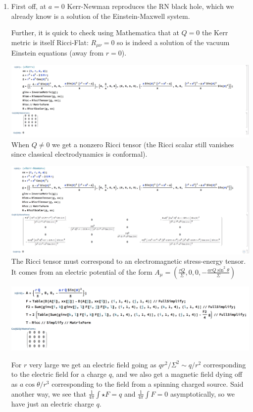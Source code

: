 \documentclass[11pt, class=article, crop=false]{standalone}
\begin{document}
\begin{enumerate}
	\item First off, at $a = 0$ Kerr-Newman reproduces the RN black hole, which we already know is a solution of the Einstein-Maxwell system. 
	
	Further, it is quick to check using Mathematica that at $Q=0$ the Kerr metric is itself Ricci-Flat: $R_{\mu \nu} = 0$ so is indeed a solution of the vacuum Einstein equations (away from $r = 0$). 
	
	\hspace{-.5in}
	\includegraphics[scale=0.5]{"Figures/Kerr"}
	When $Q \neq 0$ we get a nonzero Ricci tensor (the Ricci scalar still vanishes since classical electrodynamics is conformal). 
	
	\hspace{-.5in}
	\includegraphics[scale=0.5]{"Figures/Kerr-Newman"}
	The Ricci tensor must correspond to an electromagnetic stress-energy tensor. It comes from an electric potential of the form $A_\mu = (\frac{r Q}{\Sigma}, 0, 0, - \frac{a r Q \sin^2 \theta}{\Sigma})$
	\begin{center}
		\includegraphics[scale=0.5]{"Figures/T-Ricc"}
	\end{center}
	
	For $r$ very large we get an electric field going as $q r^2/\Sigma^2 \sim q/r^2$ corresponding to the electric field for a charge $q$, and we also get a magnetic field dying off as $a \cos \theta/r^3$ corresponding to the field from a spinning charged source. Said another way, we see that $\frac{1}{4\pi} \int \star F = q$ and $\frac{1}{4\pi} \int F = 0$ asymptotically, so we have just an electric charge $q$. 
	

\end{enumerate}
\end{document}
